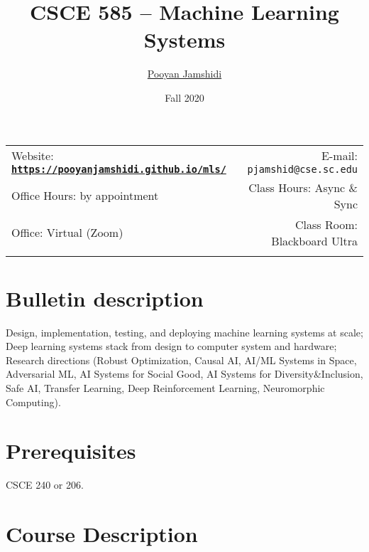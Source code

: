 \documentclass[11pt]{article}
\title{CSCE 585 -- Machine Learning Systems}
\author{\href{https://pooyanjamshidi.github.io/}{Pooyan Jamshidi}}
\date{Fall 2020}
\newcommand{\blankline}{\quad\pagebreak[2]}
\begin{document}
\maketitle

\blankline

\begin{tabular*}{.93\textwidth}{@{\extracolsep{\fill}}lr}


Website: \href{https://pooyanjamshidi.github.io/mls/}{\tt\bf https://pooyanjamshidi.github.io/mls/}  & E-mail: \texttt{pjamshid@cse.sc.edu} \\

Office Hours: by appointment  &  Class Hours: Async \& Sync \\

Office: Virtual (Zoom) & Class Room: Blackboard Ultra \\
&  \\

\hline
\end{tabular*}

\vspace{10mm}

\section*{Bulletin description}
Design, implementation, testing, and deploying machine learning systems at scale; Deep learning systems stack from design to computer system and hardware; Research directions (Robust Optimization, Causal AI, AI/ML Systems in Space, Adversarial ML, AI Systems for Social Good, AI Systems for Diversity\&Inclusion, Safe AI, Transfer Learning, Deep Reinforcement Learning, Neuromorphic Computing).

\section*{Prerequisites}
CSCE 240 or 206.

\section*{Course Description}
\end{document}
